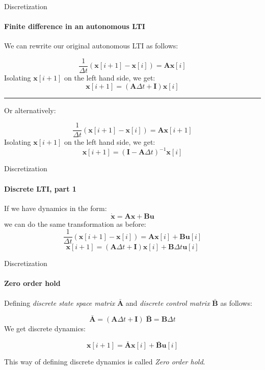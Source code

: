 \documentclass{beamer}
\begin{document}
\begin{frame}{Discretization}
\framesubtitle{Finite difference in an autonomous LTI}
\begin{flushleft}

We can rewrite our original autonomous LTI as follows:

\[
\frac{1}{\Delta t}(\mathbf x[i + 1] - \mathbf x[i]) = \mathbf A \mathbf x[i]
\]
Isolating $\mathbf x[i + 1]$ on the left hand side, we get:
\[
\mathbf x[i + 1] = (\mathbf A \Delta t + \mathbf I) \mathbf x[i]
\]

\noindent\rule{12cm}{0.4pt}

Or alternatively:

\[
\frac{1}{\Delta t}(\mathbf x[i + 1] - \mathbf x[i]) = \mathbf A \mathbf x[i + 1]
\]
Isolating $\mathbf x[i + 1]$ on the left hand side, we get:
\[
\mathbf x[i + 1] = (\mathbf I - \mathbf A \Delta t)^{-1} \mathbf x[i] 
\]

\end{flushleft}
\end{frame}

\begin{frame}{Discretization}
\framesubtitle{Discrete LTI, part 1}
\begin{flushleft}

If we have dynamics in the form:
\[
\dot {\mathbf x} = \mathbf A \mathbf x + \mathbf B \mathbf u
\]
%
we can do the same transformation as before:
\[
\frac{1}{\Delta t}(\mathbf x[i + 1] - \mathbf x[i]) = \mathbf A \mathbf x[i] + \mathbf B \mathbf u[i]
\]
\[
\mathbf x[i + 1] = (\mathbf A \Delta t + \mathbf I) \mathbf x[i] + \mathbf B \Delta t \mathbf u[i]
\]

\end{flushleft}
\end{frame}


\begin{frame}{Discretization}
\framesubtitle{Zero order hold}
\begin{flushleft}

Defining \emph{discrete state space matrix} $\bar{\mathbf A}$ and \emph{discrete control matrix} $\bar{\mathbf B}$ as follows:

\[
\bar{\mathbf A} = (\mathbf A \Delta t + \mathbf I) \;  \bar{\mathbf B} = \mathbf B \Delta t
\]
%
We get discrete dynamics:

\[
\mathbf x[i + 1] = \bar{\mathbf A} \mathbf x[i] + \bar{\mathbf B} \mathbf u[i]
\]

This way of defining discrete dynamics is called \emph{Zero order hold}.

\end{flushleft}
\end{frame}
\end{document}
